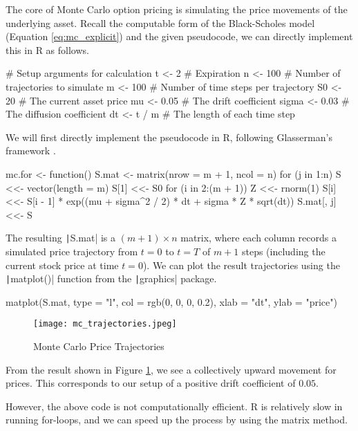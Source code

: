 The core of Monte Carlo option pricing is simulating the price movements of the underlying asset. Recall the computable form of the Black-Scholes model (Equation \ref{eq:mc_explicit}) and the given pseudocode, we can directly implement this in R as follows.

\begin{Rminted}
# Setup arguments for calculation
t <- 2 # Expiration
n <- 100 # Number of trajectories to simulate
m <- 100 # Number of time steps per trajectory
S0 <- 20 # The current asset price
mu <- 0.05 # The drift coefficient
sigma <- 0.03 # The diffusion coefficient
dt <- t / m # The length of each time step
\end{Rminted}

We will first directly implement the pseudocode in R, following Glasserman's framework \cite{Glasserman2003}.

\begin{Rminted}
mc.for <- function() {
    S.mat <- matrix(nrow = m + 1, ncol = n)
    for (j in 1:n) {
        S <<- vector(length = m)
        S[1] <<- S0
        for (i in 2:(m + 1)) {
            Z <<- rnorm(1)
            S[i] <<- S[i - 1] * exp((mu + sigma^2 / 2) * dt + sigma * Z * sqrt(dt))
        }
        S.mat[, j] <<- S
    }
}
\end{Rminted}

The resulting \texttt|S.mat| is a $(m + 1) \times n$ matrix, where each column records a simulated price trajectory from $t=0$ to $t=T$ of $m+1$ steps (including the current stock price at time $t=0$). We can plot the result trajectories using the \texttt|matplot()| function from the \texttt|graphics| package.

\begin{Rminted}
matplot(S.mat, type = "l", col = rgb(0, 0, 0, 0.2),
        xlab = "dt", ylab = "price")
\end{Rminted}

\begin{figure}[H]
	\centering
	\texttt{[image: mc\_trajectories.jpeg]}
	\caption{Monte Carlo Price Trajectories} \label{img:mc_trajectories}
\end{figure}

From the result shown in Figure \ref{img:mc_trajectories}, we see a collectively upward movement for prices. This corresponds to our setup of a positive drift coefficient of $0.05$.

However, the above code is not computationally efficient. R is relatively slow in running for-loops, and we can speed up the process by using the matrix method.

